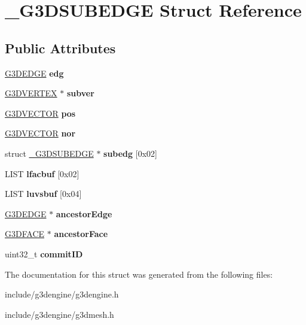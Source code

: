 \hypertarget{struct__G3DSUBEDGE}{}\section{\+\_\+\+G3\+D\+S\+U\+B\+E\+D\+GE Struct Reference}
\label{struct__G3DSUBEDGE}
\subsection*{Public Attributes}
\begin{DoxyCompactItemize}
\item 
\mbox{\label{struct__G3DSUBEDGE_ae4e3fc7c83f2a4b9f8a42e32882fc8d8}} 
\hyperlink{struct__G3DEDGE}{G3\+D\+E\+D\+GE} {\bfseries edg}
\item 
\mbox{\label{struct__G3DSUBEDGE_a23fe4cc9d147fcab1c701c1e17b4744c}} 
\hyperlink{struct__G3DVERTEX}{G3\+D\+V\+E\+R\+T\+EX} $\ast$ {\bfseries subver}
\item 
\mbox{\label{struct__G3DSUBEDGE_af16e2e4e83882929fbf4254f88729f36}} 
\hyperlink{structG3DVECTOR}{G3\+D\+V\+E\+C\+T\+OR} {\bfseries pos}
\item 
\mbox{\label{struct__G3DSUBEDGE_ac83cdd7c4f9d947aa67addc9698ffa45}} 
\hyperlink{structG3DVECTOR}{G3\+D\+V\+E\+C\+T\+OR} {\bfseries nor}
\item 
\mbox{\label{struct__G3DSUBEDGE_a01643fc4cb82667f453ad9b6b363ab02}} 
struct \hyperlink{struct__G3DSUBEDGE}{\+\_\+\+G3\+D\+S\+U\+B\+E\+D\+GE} $\ast$ {\bfseries subedg} \mbox{[}0x02\mbox{]}
\item 
\mbox{\label{struct__G3DSUBEDGE_aba03b0fd835ec3aad305c93f65a5ae0e}} 
L\+I\+ST {\bfseries lfacbuf} \mbox{[}0x02\mbox{]}
\item 
\mbox{\label{struct__G3DSUBEDGE_ad5e2e99d4a1a10f62d3f32ce224fb1bb}} 
L\+I\+ST {\bfseries luvsbuf} \mbox{[}0x04\mbox{]}
\item 
\mbox{\label{struct__G3DSUBEDGE_a7821756eccbd77057dc9637e3ca10250}} 
\hyperlink{struct__G3DEDGE}{G3\+D\+E\+D\+GE} $\ast$ {\bfseries ancestor\+Edge}
\item 
\mbox{\label{struct__G3DSUBEDGE_ac04f80f033f43d682afccb5cb8585e91}} 
\hyperlink{struct__G3DFACE}{G3\+D\+F\+A\+CE} $\ast$ {\bfseries ancestor\+Face}
\item 
\mbox{\label{struct__G3DSUBEDGE_af70bbb5210ade43fba35c0f2c31b2588}} 
uint32\+\_\+t {\bfseries commit\+ID}
\end{DoxyCompactItemize}


The documentation for this struct was generated from the following files\+:\begin{DoxyCompactItemize}
\item 
include/g3dengine/g3dengine.\+h\item 
include/g3dengine/g3dmesh.\+h\end{DoxyCompactItemize}
